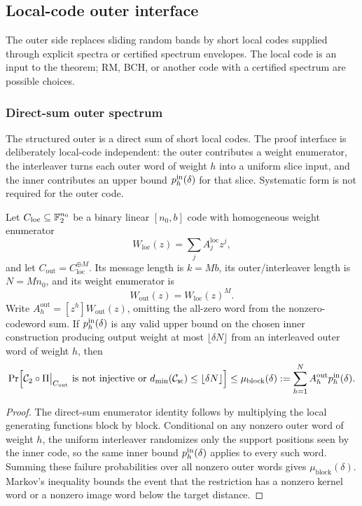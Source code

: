 \subsection{Local-code outer interface}
\label{sec:local-code-outer}

The outer side replaces sliding random bands by short local codes supplied
through explicit spectra or certified spectrum envelopes.  The local code is an
input to the theorem; RM, BCH, or another code with a certified spectrum are
possible choices.

\subsubsection{Direct-sum outer spectrum}
\label{subsec:local-code-outer-interface}

The structured outer is a direct sum of short local codes.  The proof interface
is deliberately local-code independent: the outer contributes a weight
enumerator, the interleaver turns each outer word of weight \(h\) into a uniform
slice input, and the inner contributes an upper bound
\(p_h^{\rm in}(\delta)\) for that slice.  Systematic form is not required for
the outer code.

\begin{lemma}
\label{lem:block-outer-first-moment-interface}
Let \(C_{\mathrm{loc}}\subseteq\mathbb{F}_2^{n_0}\) be a binary linear \([n_0,b]\) code
with homogeneous weight enumerator
\[
W_{\mathrm{loc}}(z)=\sum_j A^{\mathrm{loc}}_j z^j,
\]
and let \(C_{\mathrm{out}}=C_{\mathrm{loc}}^{\oplus M}\).  Its message length
is \(k=Mb\), its outer/interleaver length is \(N=Mn_0\), and its weight
enumerator is
\[
W_{\mathrm{out}}(z)=W_{\mathrm{loc}}(z)^M .
\]
Write \(A_h^{\mathrm{out}}=[z^h]W_{\mathrm{out}}(z)\), omitting the all-zero
word from the nonzero-codeword sum.  If \(p_h^{\rm in}(\delta)\) is any valid
upper bound on the chosen inner construction producing output weight at most
\(\lfloor\delta N\rfloor\) from an interleaved outer word of weight \(h\), then
\[
\Pr\Bigl[
 {\mathcal{C}_2}\circ\Pi\big|_{C_{\mathrm{out}}}\text{ is not injective}
 \ \text{or}\ d_{\min}({\mathcal{C}_{\mathsf{sc}}})\le \lfloor\delta N\rfloor
\Bigr]
\le
\mu_{\mathrm{block}}(\delta)
:=
\sum_{h=1}^{N} A_h^{\mathrm{out}}p_h^{\rm in}(\delta).
\]
\end{lemma}

\begin{proof}
The direct-sum enumerator identity follows by multiplying the local generating
functions block by block.  Conditional on any nonzero outer word of weight
\(h\), the uniform interleaver randomizes only the support positions seen by
the inner code, so the same inner bound \(p_h^{\rm in}(\delta)\) applies to
every such word.  Summing these failure probabilities over all nonzero outer
words gives \(\mu_{\mathrm{block}}(\delta)\).  Markov's inequality bounds the
event that the restriction has a nonzero kernel word or a nonzero image word
below the target distance.
\end{proof}

